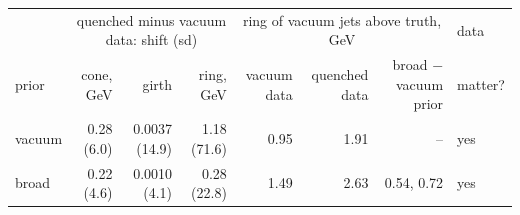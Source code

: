 \scriptsize
\setlength{\tabcolsep}{3pt}
\begin{tabular}{lrrrrrrl}
\toprule
 & \multicolumn{3}{c}{quenched minus vacuum data: shift (sd)} & \multicolumn{3}{c}{ring of vacuum jets above truth, GeV} & data \\
prior & cone, GeV & girth & ring, GeV & vacuum data & quenched data & broad $-$ vacuum prior & matter? \\
\midrule
vacuum & 0.28 (6.0) & 0.0037 (14.9) & 1.18 (71.6) & 0.95 & 1.91 & -- & yes \\
broad & 0.22 (4.6) & 0.0010 (4.1) & 0.28 (22.8) & 1.49 & 2.63 & 0.54, 0.72 & yes \\
\bottomrule
\end{tabular}
